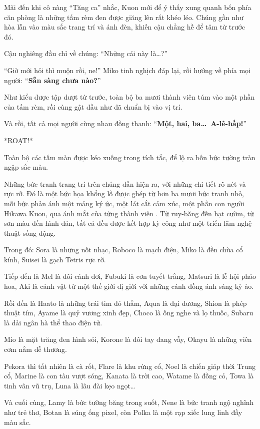 \documentclass[../main.tex]{subfiles}
\begin{document}
Mãi đến khi cô nàng ``Tăng ca'' nhắc, Kuon mới để ý thấy xung quanh bốn phía căn phòng là những tấm rèm đen được giăng lên rất khéo léo. Chúng gần như hòa lẫn vào màu sắc trang trí và ánh đèn, khiến cậu chẳng hề để tâm từ trước đó.

Cậu nghiêng đầu chỉ về chúng: ``Những cái này là\dots?''

``Giờ mới hỏi thì muộn rồi, ne!'' Miko tinh nghịch đáp lại, rồi hướng về phía mọi người: ``\textbf{Sẵn sàng chưa nào?}''

Như kiểu được tập dượt từ trước, toàn bộ ba mươi thành viên túm vào một phần của tấm rèm, rồi cùng gật đầu như đã chuẩn bị vào vị trí.

Và rồi, tất cả mọi người cùng nhau đồng thanh: ``\textbf{Một, hai, ba\dots\ A-lê-hấp!}''

*ROẠT!*

Toàn bộ các tấm màn được kéo xuống trong tích tắc, để lộ ra bốn bức tường tràn ngập sắc màu.

Những bức tranh trang trí trên chúng dần hiện ra, với những chi tiết rõ nét và rực rỡ. Đó là một bức họa khổng lồ được ghép từ hơn ba mươi bức tranh nhỏ, mỗi bức phản ánh một mảng ký ức, một lát cắt cảm xúc, một phần con người Hikawa Kuon, qua ánh mắt của từng thành viên \hll. Từ ruy-băng đến hạt cườm, từ sơn màu đến hình dán, tất cả đều được kết hợp kỳ công như một triển lãm nghệ thuật sống động.

Trong đó: Sora là những nốt nhạc, Roboco là mạch điện, Miko là đền chùa cổ kính, Suisei là gạch Tetris rực rỡ.

Tiếp đến là Mel là đôi cánh dơi, Fubuki là cơn tuyết trắng, Matsuri là lễ hội pháo hoa, Aki là cảnh vật từ một thế giới dị giới với những cánh đồng ánh sáng kỳ ảo.

Rồi đến là Haato là những trái tim đỏ thắm, Aqua là đại dương, Shion là phép thuật tím, Ayame là quỷ vương xinh đẹp, Choco là ống nghe và lọ thuốc, Subaru là dải ngân hà thể thao điện tử.

Mio là mặt trăng đen hình sói, Korone là đôi tay đang vẫy, Okayu là những viên cơm nắm dễ thương.

Pekora  thì tất nhiên là cà rốt, Flare là khu rừng cổ, Noel là chiến giáp thời Trung cổ, Marine là con tàu vượt sóng, Kanata là trời cao, Watame là đồng cỏ, Towa là tinh vân vũ trụ, Luna là lâu đài kẹo ngọt\dots

Và cuối cùng, Lamy là bức tường băng trong suốt, Nene là bức tranh ngộ nghĩnh như trẻ thơ, Botan là súng ống pixel, còn Polka là một rạp xiếc lung linh đầy màu sắc.
\end{document}
